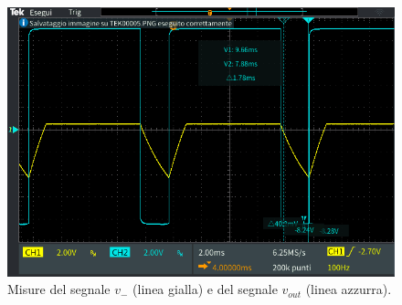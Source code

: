 \begin{figure}[h!]
	\centering
	\includegraphics[width=\linewidth]{./ImageFiles/Laboratorio 4/TEK00006.PNG}
	\caption{Misure del segnale $v_{-}$ (linea gialla) e del segnale $v_{out}$ (linea azzurra).}
	\label{fig:calcolo_ta}
\end{figure}

